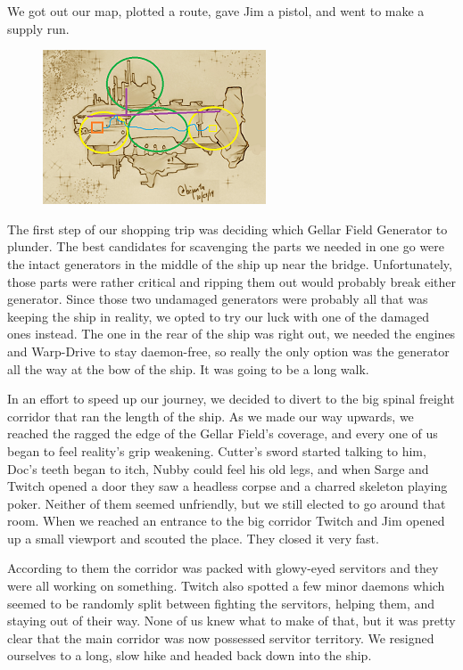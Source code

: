 We got out our map, plotted a route, gave Jim a pistol, and went to make a supply run.

\begin{figure}
	\begin{center}
		\includegraphics[width=\figwidth]{pics/7/26.png}
	\end{center}
\end{figure}
The first step of our shopping trip was deciding which Gellar Field Generator to plunder. 
The best candidates for scavenging the parts we needed in one go were the intact generators in the middle of the ship up near the bridge. 
Unfortunately, those parts were rather critical and ripping them out would probably break either generator. 
Since those two undamaged generators were probably all that was keeping the ship in reality, we opted to try our luck with one of the damaged ones instead. 
The one in the rear of the ship was right out, we needed the engines and Warp-Drive to stay daemon-free, so really the only option was the generator all the way at the bow of the ship. 
It was going to be a long walk.

In an effort to speed up our journey, we decided to divert to the big spinal freight corridor that ran the length of the ship. 
As we made our way upwards, we reached the ragged the edge of the Gellar Field’s coverage, and every one of us began to feel reality’s grip weakening. 
Cutter’s sword started talking to him, Doc’s teeth began to itch, Nubby could feel his old legs, and when Sarge and Twitch opened a door they saw a headless corpse and a charred skeleton playing poker. 
Neither of them seemed unfriendly, but we still elected to go around that room. 
When we reached an entrance to the big corridor Twitch and Jim opened up a small viewport and scouted the place. 
They closed it very fast.

According to them the corridor was packed with glowy-eyed servitors and they were all working on something. 
Twitch also spotted a few minor daemons which seemed to be randomly split between fighting the servitors, helping them, and staying out of their way. 
None of us knew what to make of that, but it was pretty clear that the main corridor was now possessed servitor territory. 
We resigned ourselves to a long, slow hike and headed back down into the ship.

